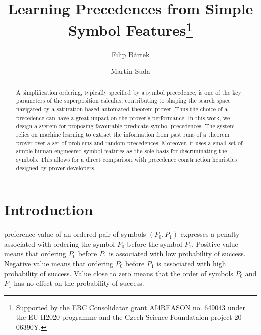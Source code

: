 

\title{Learning Precedences from Simple Symbol Features\thanks{Supported by the ERC Consolidator grant AI4REASON no. 649043 under the EU-H2020 programme and the Czech Science Foundataion project 20-06390Y.}}
\author{Filip B\'{a}rtek \and Martin Suda}



\maketitle

\begin{abstract}
A simplification ordering, typically specified by a symbol precedence,
is one of the key parameters of the superposition calculus, contributing
to shaping the search space navigated by a saturation-based automated theorem prover.
Thus the choice of a precedence can have a great impact on the prover's performance.
In this work, we design a system for proposing favourable predicate symbol precedences.
The system relies on machine learning to extract the information from
past runs of a theorem prover over a set of problems and random precedences.
Moreover, it uses a small set of simple human-engineered symbol features as the sole
basis for discriminating the symbols. This allows for a direct comparison
with precedence construction heuristics designed by prover developers.
\end{abstract}

\section{Introduction}

\Gls{preference-value} of an ordered pair of symbols \((P_0, P_1)\) expresses a penalty associated with ordering the symbol \(P_0\) before the symbol \(P_1\).
Positive value means that ordering \(P_0\) before \(P_1\) is associated with low probability of success.
Negative value means that ordering \(P_0\) before \(P_1\) is associated with high probability of success.
Value close to zero means that the order of symbols \(P_0\) and \(P_1\) has no effect on the probability of success.

